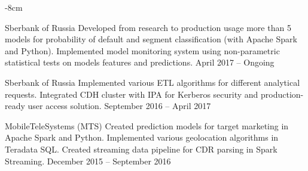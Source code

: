 \documentclass[10pt,a4paper]{altacv}
\begin{document}


\begin{adjustwidth}{}{-8cm}
\makecvheader
\end{adjustwidth}


    {Sberbank of Russia}
    {
        Developed from research to production usage more than 5 models for probability of default and segment classification (with Apache Spark and Python).\linebreak
        Implemented model monitoring system using non-parametric statistical tests on models features and predictions. 
    }
    {April 2017 -- Ongoing}
{}

\divider

    {Sberbank of Russia}
    {
        Implemented various ETL algorithms for different analytical requests. \linebreak
        Integrated CDH cluster with IPA for Kerberos security and production-ready user access solution.
    }
    {September 2016 -- April 2017}
{}

\divider

    {MobileTeleSystems (MTS)}
    {
        Created prediction models for target marketing in Apache Spark and Python. \linebreak
        Implemented various geolocation algorithms in Teradata SQL. \linebreak
        Created streaming data pipeline for CDR parsing in Spark Streaming. \linebreak
    }
    {December 2015 -- September 2016}
{}

\divider
\end{document}
